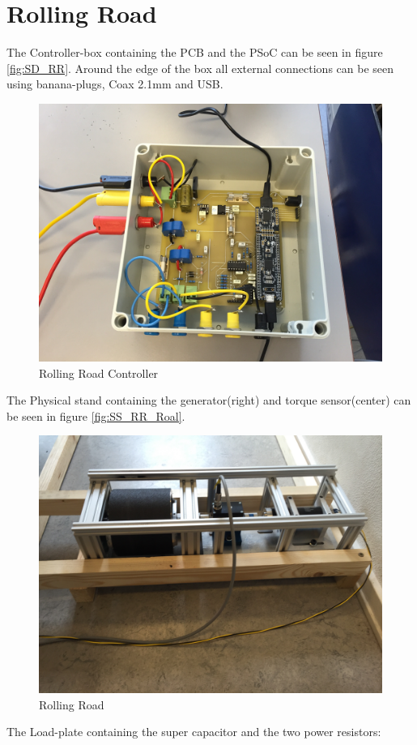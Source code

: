 \section{Rolling Road}
The Controller-box containing the PCB and the PSoC can be seen in figure \vref{fig:SD_RR}. Around the edge of the box all external connections can be seen using banana-plugs, Coax 2.1mm and USB. 

\begin{figure}[H]
	\centering
	\includegraphics[width=0.7\linewidth]{SubPages/Images/SD_RR}
	\caption{Rolling Road Controller}
	\label{fig:SD_RR}
\end{figure}


The Physical stand containing the generator(right) and torque sensor(center) can be seen in figure \vref{fig:SS_RR_Roal}.

\begin{figure}[H]
	\centering
	\includegraphics[width=0.7\linewidth]{SubPages/Images/SS_RR_Roal}
	\caption{Rolling Road}
	\label{fig:SS_RR_Roal}
\end{figure}

The Load-plate containing the super capacitor and the two power resistors:

